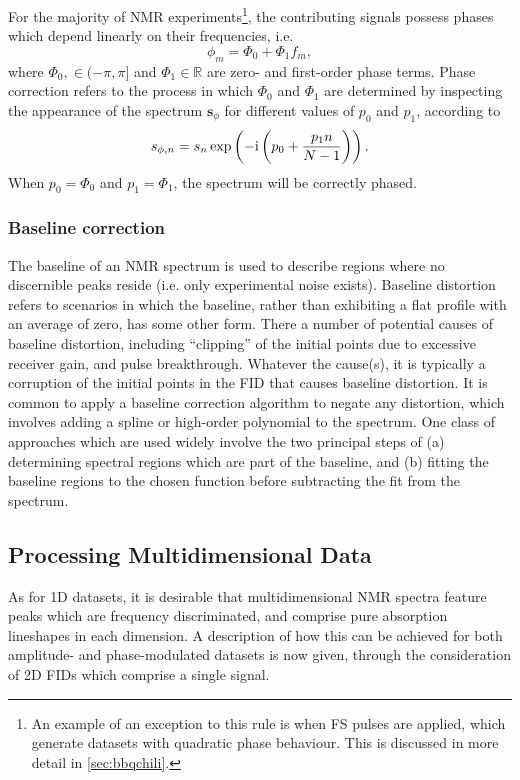 For the majority of \ac{NMR} experiments\footnote{
     An example of an exception to this rule is when \acl{FS} pulses are applied,
     which generate datasets with quadratic phase behaviour. This is discussed
     in more detail in \cref{sec:bbqchili}.
}, the contributing signals possess phases which depend linearly on their
frequencies, i.e.
\begin{equation}
    \phi_m = \Phi_0 + \Phi_1 f_m,
\end{equation}
where $\Phi_0, \in (-\pi, \pi]$ and $\Phi_1 \in \mathbb{R}$ are zero- and
first-order phase terms.
Phase correction refers to the process in which $\Phi_0$ and $\Phi_1$ are
determined by inspecting the appearance of the spectrum
$\symbf{s}_{\phi}$ for different values of $p_0$ and  $p_1$, according to
\begin{equation}
    s_{\phi,n} = s_n
    \exp\left(-\mathrm{i} \left(p_0 + \frac{p_1 n}{N - 1}\right)\right).
\end{equation}
When $p_0 = \Phi_0$ and  $p_1 = \Phi_1$, the spectrum will be correctly phased.

\subsubsection{Baseline correction}
The baseline of an \ac{NMR} spectrum is used to describe regions where
no discernible peaks reside (i.e. only experimental noise exists).
Baseline distortion refers to scenarios in which the baseline, rather
than exhibiting a flat profile with an average of zero, has some other form.
There a number of potential causes of baseline distortion, including
``clipping'' of the initial points due to excessive receiver gain,
and pulse breakthrough.
Whatever the cause(s), it is typically a corruption of the initial points in
the \ac{FID} that causes baseline distortion.
It is common to apply a baseline correction algorithm to negate any distortion,
which involves adding a spline or high-order polynomial to the spectrum.
One class of approaches which are used widely involve the two principal steps
of (a) determining spectral regions which are part of the baseline, and (b)
fitting the baseline regions to the chosen
function before subtracting the fit from the
spectrum\cite{Dietrich1991,Cobas2006}.

\subsection{Processing Multidimensional Data}
\label{subsec:multidim}
As for \ac{1D} datasets, it is desirable that multidimensional \ac{NMR} spectra
feature peaks which are frequency discriminated, and comprise pure
absorption lineshapes in each dimension.
A description of how this can be achieved for both amplitude- and
phase-modulated datasets is now given, through the consideration of \ac{2D}
\acp{FID} which comprise a single signal.

